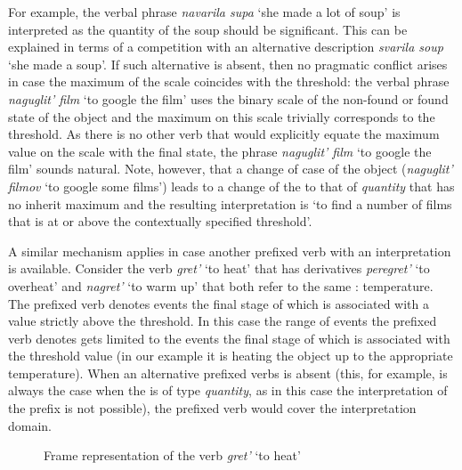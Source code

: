 For example, the verbal phrase \textit{navarila supa} `she made a lot of soup' is interpreted as the quantity of the soup should be significant. This can be explained in terms of a competition with an alternative description \textit{svarila soup} `she made a soup'. If such alternative is absent, then no pragmatic conflict arises in case the maximum of the scale coincides with the threshold: the verbal phrase \textit{naguglit' film} `to google the film' uses the binary scale of the non-found or found state of the object and the maximum on this scale trivially corresponds to the threshold. As there is no other verb that would explicitly equate the maximum value on the scale with the final state, the phrase \textit{naguglit' film} `to google the film' sounds natural. Note, however, that a change of case of the object (\textit{naguglit' filmov} `to google some films') leads to a change of the  to that of \textit{quantity} that has no inherit maximum and the resulting interpretation is `to find a number of films that is at or above the contextually specified threshold'.

A similar mechanism applies in case another prefixed verb with an  interpretation is available. Consider the verb \textit{gret'} `to heat' that has derivatives \textit{peregret'} `to overheat' and \textit{nagret'} `to warm up' that both refer to the same : temperature. The prefixed verb denotes events the final stage of which is associated with a value strictly above the threshold. In this case the range of events the prefixed verb denotes gets limited to the events the final stage of which is associated with the threshold value (in our example it is heating the object up to the appropriate temperature). When an alternative prefixed verbs is absent (this, for example, is always the case when the  is of type \textit{quantity}, as in this case the  interpretation of the prefix  is not possible), the prefixed verb would cover the  interpretation domain. 

\begin{figure}
\centering
{}
\caption{Frame representation of the verb \textit{gret'} `to heat' \label{frame:heat}}
\end{figure}

